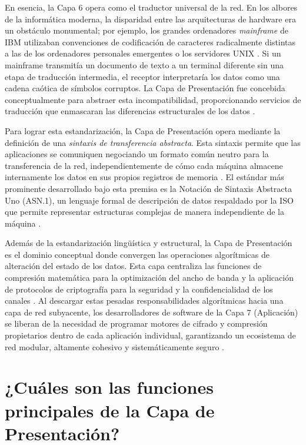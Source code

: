 \documentclass[a4paper,12pt]{article}
\begin{document}
En esencia, la Capa 6 opera como el traductor universal de la red. En los albores de la informática moderna, la disparidad entre las arquitecturas de hardware era un obstáculo monumental; por ejemplo, los grandes ordenadores \textit{mainframe} de IBM utilizaban convenciones de codificación de caracteres radicalmente distintas a las de los ordenadores personales emergentes o los servidores UNIX \cite{ionos_pres}. Si un mainframe transmitía un documento de texto a un terminal diferente sin una etapa de traducción intermedia, el receptor interpretaría los datos como una cadena caótica de símbolos corruptos. La Capa de Presentación fue concebida conceptualmente para abstraer esta incompatibilidad, proporcionando servicios de traducción que enmascaran las diferencias estructurales de los datos \cite{fortinet_osi}.

Para lograr esta estandarización, la Capa de Presentación opera mediante la definición de una \textit{sintaxis de transferencia abstracta}. Esta sintaxis permite que las aplicaciones se comuniquen negociando un formato común neutro para la transferencia de la red, independientemente de cómo cada máquina almacene internamente los datos en sus propios registros de memoria \cite{ionos_pres}. El estándar más prominente desarrollado bajo esta premisa es la Notación de Sintaxis Abstracta Uno (ASN.1), un lenguaje formal de descripción de datos respaldado por la ISO que permite representar estructuras complejas de manera independiente de la máquina \cite{prezi_pres}. 

Además de la estandarización lingüística y estructural, la Capa de Presentación es el dominio conceptual donde convergen las operaciones algorítmicas de alteración del estado de los datos. Esta capa centraliza las funciones de compresión matemática para la optimización del ancho de banda y la aplicación de protocolos de criptografía para la seguridad y la confidencialidad de los canales \cite{ibm_osi_layer6}. Al descargar estas pesadas responsabilidades algorítmicas hacia una capa de red subyacente, los desarrolladores de software de la Capa 7 (Aplicación) se liberan de la necesidad de programar motores de cifrado y compresión propietarios dentro de cada aplicación individual, garantizando un ecosistema de red modular, altamente cohesivo y sistemáticamente seguro \cite{aws_osi}.

\section{¿Cuáles son las funciones principales de la Capa de Presentación?}
\end{document}
